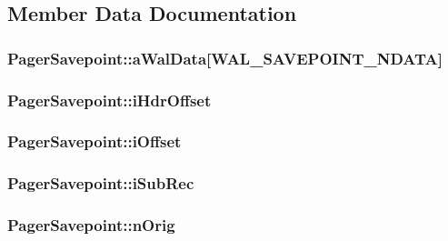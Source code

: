 \subsection{Member Data Documentation}
\hypertarget{struct_pager_savepoint_ac96cff844a24378c426a9901517f1d6c}{
\subsubsection[{a\-Wal\-Data}]{ Pager\-Savepoint\-::a\-Wal\-Data\mbox{[}{\bf W\-A\-L\-\_\-\-S\-A\-V\-E\-P\-O\-I\-N\-T\-\_\-\-N\-D\-A\-T\-A}\mbox{]}}}\label{struct_pager_savepoint_ac96cff844a24378c426a9901517f1d6c}
\hypertarget{struct_pager_savepoint_ae1afd1cf4fba6f7efd232656366121d1}{
\subsubsection[{i\-Hdr\-Offset}]{ Pager\-Savepoint\-::i\-Hdr\-Offset}}\label{struct_pager_savepoint_ae1afd1cf4fba6f7efd232656366121d1}
\hypertarget{struct_pager_savepoint_ab3ee7b75a10f47a82c8e3312bee6ad60}{
\subsubsection[{i\-Offset}]{ Pager\-Savepoint\-::i\-Offset}}\label{struct_pager_savepoint_ab3ee7b75a10f47a82c8e3312bee6ad60}
\hypertarget{struct_pager_savepoint_ac1accce313b9da31631892e2cbe85a2f}{
\subsubsection[{i\-Sub\-Rec}]{ Pager\-Savepoint\-::i\-Sub\-Rec}}\label{struct_pager_savepoint_ac1accce313b9da31631892e2cbe85a2f}
\hypertarget{struct_pager_savepoint_a944cca2844a51bdba253476f516b9865}{
\subsubsection[{n\-Orig}]{ Pager\-Savepoint\-::n\-Orig}}\label{struct_pager_savepoint_a944cca2844a51bdba253476f516b9865}
